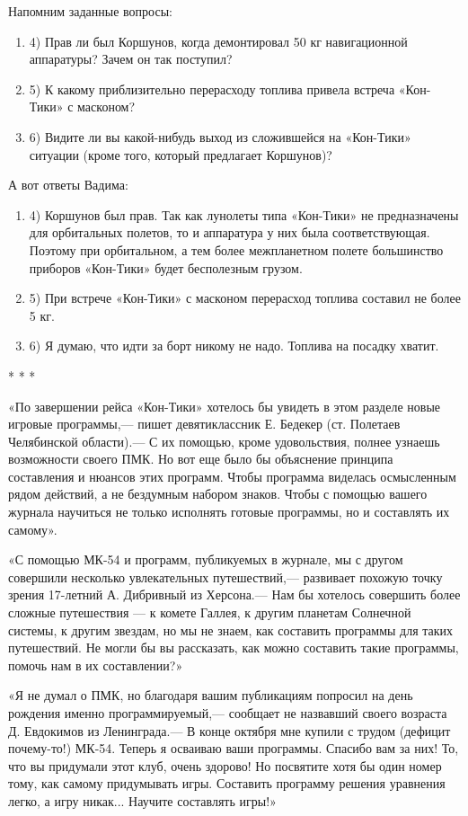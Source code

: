 \documentclass[11pt,a4paper,oneside]{article}
\begin{document}
Напомним заданные вопросы:
\begin{enumerate}
\item 4) 	Прав ли был Коршунов, когда демонтировал 50 кг навигационной аппаратуры? Зачем он так поступил?
\item 5) 	К какому приблизительно перерасходу топлива привела встреча «Кон-Тики» с масконом?
\item 6) 	Видите ли вы какой-нибудь выход из сложившейся на «Кон-Тики» ситуации (кроме того, который предлагает Коршунов)?
\end{enumerate}

А вот ответы Вадима:
\begin{enumerate}
\item 4) 	Коршунов был прав. Так как лунолеты типа «Кон-Тики» не предназначены для орбитальных полетов, то и аппаратура у них была соответствующая. Поэтому при орбитальном, а тем более межпланетном полете большинство приборов «Кон-Тики» будет бесполезным грузом.
\item 5) 	При встрече «Кон-Тики» с масконом перерасход топлива составил не более 5 кг.
\item 6) 	Я думаю, что идти за борт никому не надо. Топлива на посадку хватит.
\end{enumerate}

* * *

«По завершении рейса «Кон-Тики» хотелось бы увидеть в этом разделе новые игровые программы,— пишет девятиклассник Е. Бедекер (ст. Полетаев Челябинской области).— С их помощью, кроме удовольствия, полнее узнаешь возможности своего ПМК. Но вот еще было бы объяснение принципа составления и нюансов этих программ. Чтобы программа виделась осмысленным рядом действий, а не бездумным набором знаков. Чтобы с помощью вашего журнала научиться не только исполнять готовые программы, но и составлять их самому».

«С помощью МК-54 и программ, публикуемых в журнале, мы с другом совершили несколько увлекательных путешествий,— развивает похожую точку зрения 17-летний А. Дибривный из Херсона.— Нам бы хотелось совершить более сложные путешествия — к комете Галлея, к другим планетам Солнечной системы, к другим звездам, но мы не знаем, как составить программы для таких путешествий. Не могли бы вы рассказать, как можно составить такие программы, помочь нам в их составлении?»

«Я не думал о ПМК, но благодаря вашим публикациям попросил на день рождения именно программируемый,— сообщает не назвавший своего возраста Д. Евдокимов из Ленинграда.— В конце октября мне купили с трудом (дефицит почему-то!) МК-54. Теперь я осваиваю ваши программы. Спасибо вам за них! То, что вы придумали этот клуб, очень здорово! Но посвятите хотя бы один номер тому, как самому придумывать игры. Составить программу решения уравнения легко, а игру никак... Научите составлять игры!»
\end{document}

